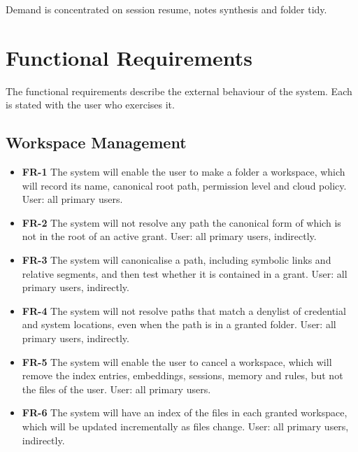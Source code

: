 \documentclass{FastFyp}
\begin{document}
Demand is concentrated on session resume, notes synthesis and folder tidy.

\section{Functional Requirements}
The functional requirements describe the external behaviour of the system. Each is stated with the user who exercises it.

\subsection{Workspace Management}
\begin{itemize}
    \item \textbf{FR-1} The system will enable the user to make a folder a workspace, which will record its name, canonical root path, permission level and cloud policy. User: all primary users.
    \item \textbf{FR-2} The system will not resolve any path the canonical form of which is not in the root of an active grant. User: all primary users, indirectly.
    \item \textbf{FR-3} The system will canonicalise a path, including symbolic links and relative segments, and then test whether it is contained in a grant. User: all primary users, indirectly.
    \item \textbf{FR-4} The system will not resolve paths that match a denylist of credential and system locations, even when the path is in a granted folder. User: all primary users, indirectly.
    \item \textbf{FR-5} The system will enable the user to cancel a workspace, which will remove the index entries, embeddings, sessions, memory and rules, but not the files of the user. User: all primary users.
    \item \textbf{FR-6} The system will have an index of the files in each granted workspace, which will be updated incrementally as files change. User: all primary users, indirectly.
\end{itemize}
\end{document}
